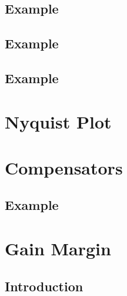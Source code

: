 \documentclass[journal,12pt,twocolumn]{IEEEtran}
\begin{document}
\subsection{Example}

%

\subsection{Example}

%

\subsection{Example}

%

\section{Nyquist Plot}

%

\section{Compensators}


%

%

\subsection{Example}

%

\section{Gain Margin}

\subsection{Introduction}

%
\end{document}
